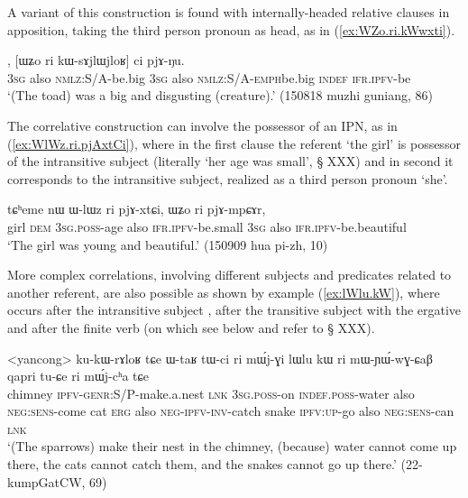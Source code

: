 A variant of this construction is found with internally-headed relative clauses in apposition, taking the third person pronoun  as head, as in (\ref{ex:WZo.ri.kWwxti}).

\begin{exe}
\ex \label{ex:WZo.ri.kWwxti}
, [ɯʑo ri kɯ-sɤjlɯ\redp{}jloʁ] ci pjɤ-ŋu. \\
\textsc{3sg} also \textsc{nmlz}:S/A-be.big \textsc{3sg} also \textsc{nmlz}:S/A-\textsc{emph}\redp{}be.big \textsc{indef} \textsc{ifr}.\textsc{ipfv}-be \\
\glt `(The toad) was a big and disgusting (creature).' (150818 muzhi guniang, 86)
\end{exe}

 
The correlative construction can involve the possessor of an IPN, as in (\ref{ex:WlWz.ri.pjAxtCi}), where in the first clause the referent `the girl' is possessor of the intransitive subject (literally `her age was small', § XXX) and in second it corresponds to the intransitive subject, realized as a third person pronoun  `she'.

  \begin{exe}
\ex \label{ex:WlWz.ri.pjAxtCi}
 \gll tɕʰeme nɯ ɯ-lɯz ri pjɤ-xtɕi, ɯʑo ri pjɤ-mpɕɤr,  \\
 girl \textsc{dem} \textsc{3sg}.\textsc{poss}-age also \textsc{ifr}.\textsc{ipfv}-be.small \textsc{3sg} also \textsc{ifr}.\textsc{ipfv}-be.beautiful \\
\glt `The girl was young and beautiful.' (150909 hua pi-zh, 10)
 \end{exe}
 
 More complex correlations, involving different subjects and predicates related to another referent, are also possible as shown by example (\ref{ex:lWlu.kW}), where  occurs after the intransitive subject , after the transitive subject  with the ergative and after the finite verb  (on which see below and refer to § XXX).
 
 \begin{exe}
\ex   \label{ex:lWlu.kW}
\gll <yancong> ku-kɯ-rɤloʁ tɕe ɯ-taʁ tɯ-ci ri mɯ́j-ɣi lɯlu kɯ ri mɯ-ɲɯ́-wɣ-ɕaβ qapri tu-ɕe ri mɯ́j-cʰa tɕe \\
 chimney \textsc{ipfv}-\textsc{genr}:S/P-make.a.nest \textsc{lnk} \textsc{3sg}.\textsc{poss}-on \textsc{indef}.\textsc{poss}-water also \textsc{neg}:\textsc{sens}-come cat \textsc{erg} also \textsc{neg}-\textsc{ipfv}-\textsc{inv}-catch snake \textsc{ipfv}:\textsc{up}-go also \textsc{neg}:\textsc{sens}-can \textsc{lnk} \\
 \glt `(The sparrows) make their nest in the chimney, (because) water cannot come up there, the cats cannot catch them, and the snakes cannot go up there.' (22-kumpGatCW, 69)
 \end{exe}
 
